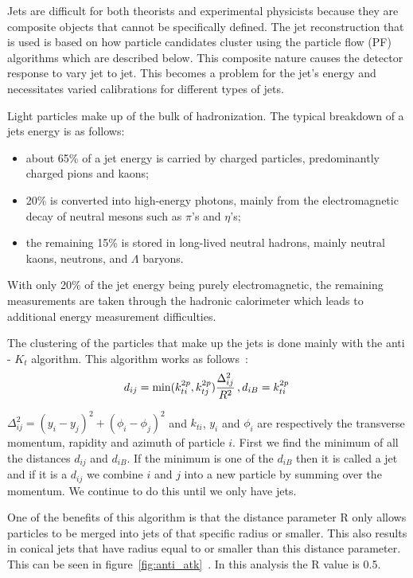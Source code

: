 Jets are difficult for both theorists and experimental physicists because they are composite objects that cannot be specifically defined.  The jet reconstruction that is used is based on how particle candidates cluster using the particle flow (PF) algorithms which are described below.  This composite nature causes the detector response to vary jet to jet. This becomes a problem for the jet's energy and necessitates varied calibrations for different types of jets.  

Light particles make up of the bulk of hadronization.  The typical breakdown of a jets energy is as follows:
\begin{itemize}
 \item
about 65\% of a jet energy is carried by charged particles, predominantly
charged pions and kaons;
\item
 20\% is converted into high-energy photons, mainly from the electromagnetic
decay of neutral mesons such as $\pi$'s and $\eta$'s;
\item
 the remaining 15\% is stored in long-lived neutral hadrons, mainly neutral
kaons, neutrons, and $\Lambda$ baryons.~\cite{Pandolfi_thesis}
\end{itemize}

With only 20\% of the jet energy being purely electromagnetic, the remaining measurements are taken through the hadronic calorimeter which leads to additional energy measurement difficulties.

The clustering of the particles that make up the jets is done mainly with the anti - $K_t$ algorithm.  This algorithm works as follows~\cite{1126-6708-2008-04-063}:
\begin{equation}
d_{ij} = \min(k_{ti}^{2p}, k_{tj}^{2p}) \frac{\Delta_{ij}^2}{R^2}\,,\\
d_{iB} = k_{ti}^{2p}\,
\end{equation}

$\Delta_{ij}^2 = (y_i-y_j)^2 + (\phi_i - \phi_j)^2$ and $k_{ti}$, $y_i$ and $\phi_i$ are respectively the transverse momentum, rapidity and azimuth of particle $i$. First we find the minimum of all the distances $d_{ij}$ and $d_{iB}$. If the minimum is one of the $d_{iB}$ then it is called a jet and if it is a $d_{ij}$ we combine $i$ and $j$ into a new particle by summing over the momentum.  We continue to do this until we only have jets.

One of the benefits of this algorithm is that the distance parameter R only allows particles to be merged into jets of that specific radius or smaller.  This also results in conical jets that have radius equal to or smaller than this distance parameter. This can be seen in figure~\ref{fig:anti_atk}~\cite{1126-6708-2008-04-063}. In this analysis the R value is 0.5.


